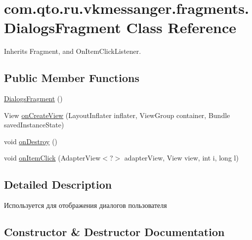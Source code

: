 \hypertarget{classcom_1_1qto_1_1ru_1_1vkmessanger_1_1fragments_1_1_dialogs_fragment}{}\section{com.\+qto.\+ru.\+vkmessanger.\+fragments.\+Dialogs\+Fragment Class Reference}
\label{classcom_1_1qto_1_1ru_1_1vkmessanger_1_1fragments_1_1_dialogs_fragment}


Inherits Fragment, and On\+Item\+Click\+Listener.

\subsection*{Public Member Functions}
\begin{DoxyCompactItemize}
\item 
\hyperlink{classcom_1_1qto_1_1ru_1_1vkmessanger_1_1fragments_1_1_dialogs_fragment_af81e4952912fe291bf485b39fcc678b9}{Dialogs\+Fragment} ()
\item 
View \hyperlink{classcom_1_1qto_1_1ru_1_1vkmessanger_1_1fragments_1_1_dialogs_fragment_ae63be8340014face697439c5d033e546}{on\+Create\+View} (Layout\+Inflater inflater, View\+Group container, Bundle saved\+Instance\+State)
\item 
void \hyperlink{classcom_1_1qto_1_1ru_1_1vkmessanger_1_1fragments_1_1_dialogs_fragment_a3d25c46db49c9fecf55a5a933032dc02}{on\+Destroy} ()
\item 
void \hyperlink{classcom_1_1qto_1_1ru_1_1vkmessanger_1_1fragments_1_1_dialogs_fragment_af6fb4107931c5a9fb016283de4d5d560}{on\+Item\+Click} (Adapter\+View$<$?$>$ adapter\+View, View view, int i, long l)
\end{DoxyCompactItemize}


\subsection{Detailed Description}
Используется для отображения диалогов пользователя 

\subsection{Constructor \& Destructor Documentation}
\hypertarget{classcom_1_1qto_1_1ru_1_1vkmessanger_1_1fragments_1_1_dialogs_fragment_af81e4952912fe291bf485b39fcc678b9}{}
